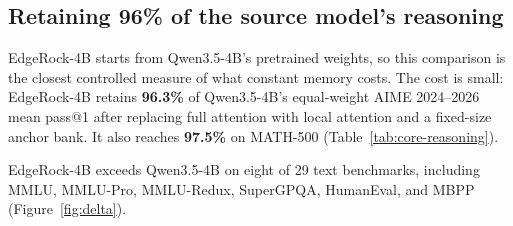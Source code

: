 \subsection{Retaining 96\% of the source model's reasoning}
\label{sec:preservation}
\label{sec:source-retention}
EdgeRock-4B starts from Qwen3.5-4B's pretrained weights, so this comparison is the closest controlled measure of what constant memory costs. The cost is small: EdgeRock-4B retains \textbf{96.3\%} of Qwen3.5-4B's equal-weight AIME 2024--2026 mean pass@1 after replacing full attention with local attention and a fixed-size anchor bank. It also reaches \textbf{97.5\%} on MATH-500 (Table~\ref{tab:core-reasoning}).

\CoreReasoningResults

EdgeRock-4B exceeds Qwen3.5-4B on eight of 29 text benchmarks, including MMLU, MMLU-Pro, MMLU-Redux, SuperGPQA, HumanEval, and MBPP (Figure~\ref{fig:delta}).
